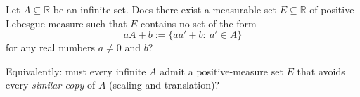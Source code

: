 Let $A\subseteq\mathbb R$ be an infinite set.  Does there exist a measurable set $E\subseteq\mathbb R$ of positive Lebesgue measure such that $E$ contains no set of the form
\[
aA+b:=\{aa'+b:\ a'\in A\}
\]
for any real numbers $a\neq0$ and $b$?

Equivalently: must every infinite $A$ admit a positive-measure set $E$ that avoids every \emph{similar copy} of $A$ (scaling and translation)?
